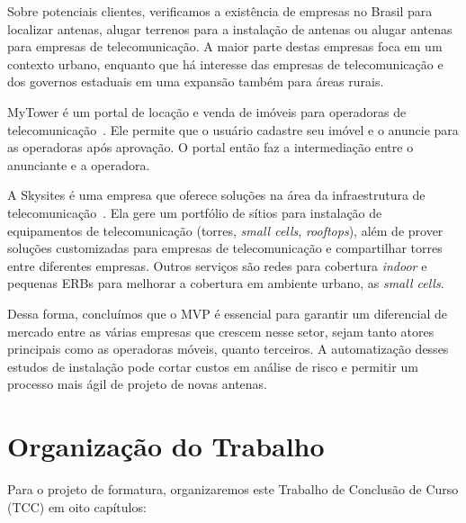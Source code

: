 \documentclass[]{politex}
\begin{document}
Sobre potenciais clientes, verificamos a existência de empresas no Brasil para
localizar antenas, alugar terrenos para a instalação de antenas ou alugar
antenas para empresas de telecomunicação. A maior parte destas empresas foca em
um contexto urbano, enquanto que há interesse das empresas de telecomunicação
e dos governos estaduais em uma expansão também para áreas rurais.

MyTower é um portal de locação e venda de imóveis para operadoras de
telecomunicação~\cite{mytower}. Ele permite que o usuário cadastre seu imóvel
e o anuncie para as operadoras após aprovação.
O portal então faz a intermediação entre o anunciante e a operadora.

A Skysites é uma empresa que oferece soluções na área da infraestrutura de
telecomunicação~\cite{skysites}. Ela gere um portfólio de sítios para
instalação de equipamentos de telecomunicação (torres, \textit{small cells}, \textit{rooftops}), além de prover soluções customizadas para empresas de telecomunicação e
compartilhar torres entre diferentes empresas. Outros serviços são redes para
cobertura \textit{indoor} e pequenas ERBs para melhorar a cobertura em ambiente
urbano, as \textit{small cells}.

Dessa forma, concluímos que o MVP é essencial para garantir um diferencial de
mercado entre as várias empresas que crescem nesse setor, sejam tanto atores
principais como as operadoras móveis, quanto terceiros. A automatização desses estudos de instalação
pode cortar custos em análise de risco e permitir um processo mais ágil de projeto de novas
antenas.

\section{Organização do Trabalho}

Para o projeto de formatura, organizaremos este Trabalho de Conclusão de Curso
(TCC) em oito capítulos:
\end{document}
